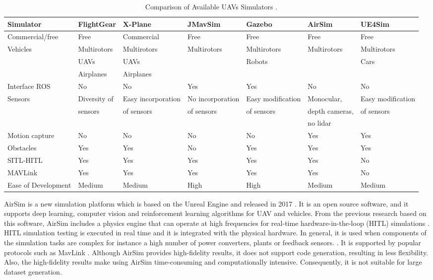 \begin{table}[H]
    \centering
    \footnotesize
    \setlength\tabcolsep{2pt}
    \begin{tabular}{@{}lllllll@{}}
        \toprule
        \textbf{Simulator} & \textbf{FlightGear} & \textbf{X-Plane} & \textbf{JMavSim} & \textbf{Gazebo} & \textbf{AirSim} & \textbf{UE4Sim}\\
        \midrule
        Commercial/free & Free & Commercial & Free & Free & Free & Free \\
        Vehicles & Multirotors & Multirotors & Multirotors & Multirotors & Multirotors & Multirotors \\ 
        & UAVs & UAVs & & Robots & & Cars \\
        & Airplanes & Airplanes & & & & \\
        Interface ROS   & No   & No         & Yes  & Yes  & No   & No \\
        Sensors         & Diversity of & Easy incorporation & No incorporation & Easy modification & Monocular, & Easy modification  \\
        & sensors & of sensors & of sensors & of sensors & depth cameras, & of sensors \\
        &  &  &  &  & no lidar &   \\
        Motion capture      & No     & No     & No   & No   & Yes    & Yes    \\
        Obstacles           & Yes    & Yes    & No   & Yes  & Yes    & Yes    \\
        SITL-HITL           & Yes    & Yes    & Yes  & Yes  & Yes    & No     \\
        MAVLink             & Yes    & Yes    & Yes  & Yes  & Yes    & No     \\
        Ease of Development & Medium & Medium & High & High & Medium & Medium \\
        \bottomrule
    \end{tabular}
    \caption[Comparison of Available UAVs Simulators.]{Comparison of Available UAVs Simulators \cite{Roy5}.}
    \label{tab:simulators}
\end{table}

AirSim is a new simulation platform which is based on the Unreal Engine and released in 2017 \cite{roy2}. It is an open source software, and it supports deep learning, computer vision and reinforcement learning algorithms for UAV and vehicles. From the previous research based on this software, AirSim includes a physics engine that can operate at high frequencies for real-time hardware-in-the-loop (HITL) simulations \cite{roy3}. HITL simulation testing is executed in real time and it is integrated with the physical hardware. In general, it is used when components of the simulation tasks are complex for instance a high number of power converters, plants or feedback sensors. \cite{ELLIS2012261}. It is supported by popular protocols such as MavLink \cite{roy3}. Although AirSim provides high-fidelity results, it does not support code generation, resulting in less flexibility. Also, the high-fidelity results make using AirSim time-consuming and computationally intensive. Consequently, it is not suitable for large dataset generation. 

